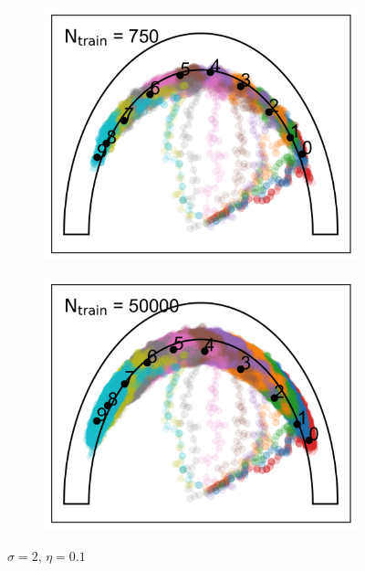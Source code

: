 \documentclass[aps,prb,twocolumn,superscriptaddress,floatfix,longbibliography]{revtex4-2}
\begin{document}
\begin{figure}
\begin{subfigure}[b]{0.24\textwidth}
      \centering
      \includegraphics[width=\textwidth]{ej2_fig2_3.png}
      \caption{\label{fig:ej2_fig2_3}}
  \end{subfigure}
  \hfill
  \begin{subfigure}[b]{0.24\textwidth}
      \centering
      \includegraphics[width=\textwidth]{ej2_fig2_4.png}
      \caption{\label{fig:ej2_fig2_4}}
  \end{subfigure}
     \caption{$\sigma = 2$, $\eta = 0.1$}
     \label{fig:ej2_fig2}
\end{figure}
\end{document}
